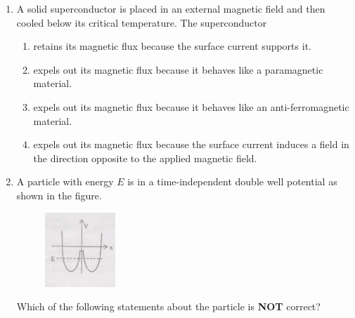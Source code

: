 \documentclass[journal,12pt,onecolumn]{IEEEtran}
\begin{document}
\begin{enumerate}[itemsep = 1em]
\hfill{}


\begin{multicols}{2}
\begin{enumerate}
\item $\dfrac{(Z_a)^N}{N!}$
\item $(Z_a)^N$
\item $N(Z_a)$
\item $\dfrac{(Z_a)^N}{N}$
\end{enumerate}
\end{multicols}


\item A solid superconductor is placed in an external magnetic field and then cooled below its critical temperature. The superconductor

\hfill{}


\begin{multicols}{2}
\begin{enumerate}
\item retains its magnetic flux because the surface current supports it.
\item expels out its magnetic flux because it behaves like a paramagnetic material.
\item expels out its magnetic flux because it behaves like an anti-ferromagnetic material.
\item expels out its magnetic flux because the surface current induces a field in the direction opposite to the applied magnetic field.

\end{enumerate}
\end{multicols}


\item A particle with energy $E$ is in a time-independent double well potential as shown in the figure.

\begin{figure}[h!]
    \centering
    \includegraphics[width=0.25\textwidth]{fig1.jpeg}
    \caption{}
    \label{fig:fig1.jpeg}
\end{figure}

Which of the following statements about the particle is \textbf{NOT} correct?


\end{enumerate}
\end{document}
